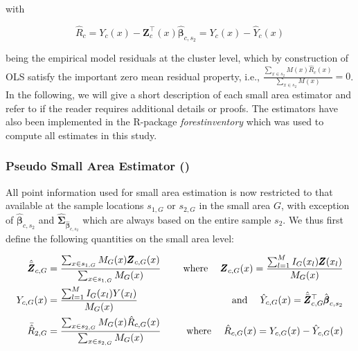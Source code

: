 \noindent with 

\begin{equation}\label{eq:globresids}
\hat{R}_{c}=Y_{c}(x)-\pmb{Z}_{c}^{\top}(x)\hat{\pmb{\beta}}_{c,s_2} = Y_{c}(x) - \hat{Y}_{c}(x)
\end{equation}

\noindent being the empirical model residuals at the cluster level, which by construction of OLS satisfy the important zero mean residual property, i.e., $\frac{\sum_{x \in s_{2}} M(x) \hat{R}_{c}(x)}{\sum_{x \in s_{2}} M(x)}=0$.\\

In the following, we will give a short description of each small area estimator and refer to \citet{mandallaz2013a, mandallaz2016, mandallaz2013b} if the reader requires additional details or proofs. The estimators have also been implemented in the R-package \textit{forestinventory} \citep{forestinventory} which was used to compute all estimates in this study.\\



\subsubsection{Pseudo Small Area Estimator (\psmall{})}
\label{sec:psmall}

All point information used for small area estimation is now restricted to that available at the sample locations $s_{1,G}$ or $s_{2,G}$ in the small area $G$, with exception of $\hat{\pmb{\beta}}_{c,s_2}$ and $\hat{\pmb{\Sigma}}_{\hat{\pmb{\beta}}_{c,s_2}}$ which are always based on the entire sample $s_2$. We thus first define the following quantities on the small area level:

\begin{subequations}\label{eq:compsG}
	\begin{align}
	\hat{\bar{\pmb{Z}}}_{c,G} &= \frac{\sum_{x \in s_{1,G}} M_{G}(x) \pmb{Z}_{c,G}(x)}{\sum_{x \in s_{1,G}} M_{G}(x)} \label{eq:meanZcG} \hspace{3ex} &\text{where} \hspace{3ex}
	\pmb{Z}_{c,G}(x) =  \frac{\sum_{l=1}^{M} I_{G}(x_l)\pmb{Z}(x_l)}{M_{G}(x)}\\		
	Y_{c,G}(x) &= \frac{\sum_{l=1}^{M} I_{G}(x_l)Y(x_l)}{M_{G}(x)}  &\text{and} \hspace{3ex}
	\hat{Y}_{c,G}(x)=\hat{\bar{\pmb{Z}}}_{c,G}^{\top}\hat{\pmb{\beta}}_{c,s_2}\\
	\bar{\hat{R}}_{2,G} &= \frac{\sum_{x \in s_{2,G}} M_{G}(x) \hat{R}_{c,G}(x)}{\sum_{x \in s_{2,G}} M_{G}(x)} \hspace{3ex} &\text{where} \hspace{3ex}
	\hat{R}_{c,G}(x) = Y_{c,G}(x)-\hat{Y}_{c,G}(x)
	\end{align}
\end{subequations}


